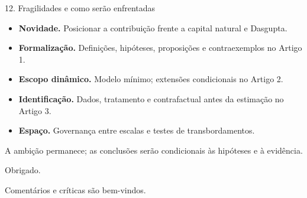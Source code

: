 \documentclass[aspectratio=169,11pt]{beamer}
\begin{document}
\begin{frame}{12. Fragilidades e como serão enfrentadas}
  \small
  \begin{itemize}
    \item \textbf{Novidade.} Posicionar a contribuição frente a capital natural e
      Dasgupta.
    \item \textbf{Formalização.} Definições, hipóteses, proposições e
      contraexemplos no Artigo 1.
    \item \textbf{Escopo dinâmico.} Modelo mínimo; extensões condicionais no
      Artigo 2.
    \item \textbf{Identificação.} Dados, tratamento e contrafactual antes da
      estimação no Artigo 3.
    \item \textbf{Espaço.} Governança entre escalas e testes de transbordamentos.
  \end{itemize}

  \vfill
  \centering
  A ambição permanece; as conclusões serão condicionais às hipóteses e à evidência.

\end{frame}

\begin{frame}
  \centering
  \vfill
  {\LARGE Obrigado.}

  \vspace{0.8cm}
  {\large Comentários e críticas são bem-vindos.}
  \vfill

\end{frame}
\end{document}
